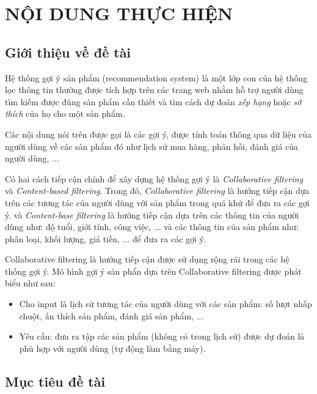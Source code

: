 \documentclass{article}[14pt]
\begin{document}
    \section{NỘI DUNG THỰC HIỆN}
    {

    
    \subsection{Giới thiệu về đề tài}
    
    
    Hệ thống gợi ý sản phẩm (recommendation system) là một lớp con của hệ thống
    lọc thông tin thường được tích hợp trên các trang web nhằm hỗ trợ người dùng
    tìm kiếm được đúng sản phẩm cần thiết  và tìm cách dự đoán 
    \textit{xếp hạng} hoặc \textit{sở thích} của họ cho một sản phẩm.
    
    Các nội dung nói trên được gọi là các gợi ý, được tính toán thông qua dữ liệu
    của người dùng về các sản phẩm đó như lịch sử mua hàng, phản hồi, đánh giá của
    người dùng, ...

    Có hai cách tiếp cận chính để xây dựng hệ thống gợi ý là 
    \textit{Collaborative filtering} và \textit{Content-based filtering}.
    Trong đó, \textit{Collaborative filtering} là hướng tiếp cận dựa trên các 
    tương tác của người dùng với sản phẩm trong quá khứ để đưa ra các gợi ý. 
    và \textit{Content-base filtering} là hướng tiếp cận dựa trên các thông tin 
    của người dùng như: độ tuổi, giới tính, công việc, ... và các thông tin 
    của sản phẩm như: phân loại, khối lượng, giá tiền, ... để đưa ra các gợi ý.

    Collaborative filtering là hướng tiếp cận được sử dụng rộng rãi trong các 
    hệ thống gợi ý. 
    Mô hình gợi ý sản phẩn dựa trên Collaborative filtering được phát biểu như 
    sau:
    \begin{itemize}
        \item Cho input là lịch sử tương tác của người dùng với các sản phẩm:
            số lượt nhấp chuột, ấn thích sản phẩm, đánh giá sản phẩm, ... 
        \item Yêu cầu: đưa ra tập các sản phẩm (không có trong lịch sử) 
        được dự đoán là phù hợp với người dùng (tự động làm bằng máy).
    \end{itemize}
    
    \subsection{Mục tiêu đề tài}
    
}
\end{document}
